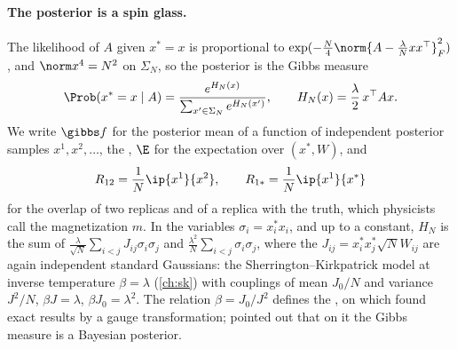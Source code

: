 \begin{refsection}
\paragraph{The posterior is a spin glass.} The likelihood of $A$ given $x^*=x$ is proportional to $\exp(-\frac N4\norm{A-\frac\lambda Nxx^\top}_F^2)$, and $\norm x^4=N^2$ on $\Sigma_N$, so the posterior is the Gibbs measure
\begin{equation}\label{eq:nishimori:posterior}
\Prob(x^*=x\mid A)=\frac{e^{H_N(x)}}{\sum_{x'\in\Sigma_N}e^{H_N(x')}},\qquad H_N(x)=\frac\lambda2\,x^\top Ax.
\end{equation}
We write $\gibbs f$ for the posterior mean of a function of independent posterior samples $x^1,x^2,\dots$, the , $\E$ for the expectation over $(x^*,W)$, and
\[
R_{12}=\frac1N\ip{x^1}{x^2},\qquad R_{1*}=\frac1N\ip{x^1}{x^*}
\]
for the overlap of two replicas and of a replica with the truth, which physicists call the magnetization $m$. In the variables $\sigma_i=x^*_ix_i$, and up to a constant, $H_N$ is the sum of $\frac\lambda{\sqrt N}\sum_{i<j}J_{ij}\sigma_i\sigma_j$ and $\frac{\lambda^2}N\sum_{i<j}\sigma_i\sigma_j$, where the $J_{ij}=x^*_ix^*_j\sqrt NW_{ij}$ are again independent standard Gaussians: the Sherrington--Kirkpatrick model at inverse temperature $\beta=\lambda$ (\cref{ch:sk}) with couplings of mean $J_0/N$ and variance $J^2/N$, $\beta J=\lambda$, $\beta J_0=\lambda^2$. The relation $\beta=J_0/J^2$ defines the , on which \textcite{Nishimori1981} found exact results by a gauge transformation; \textcite{Iba1999} pointed out that on it the Gibbs measure is a Bayesian posterior.


\end{refsection}
